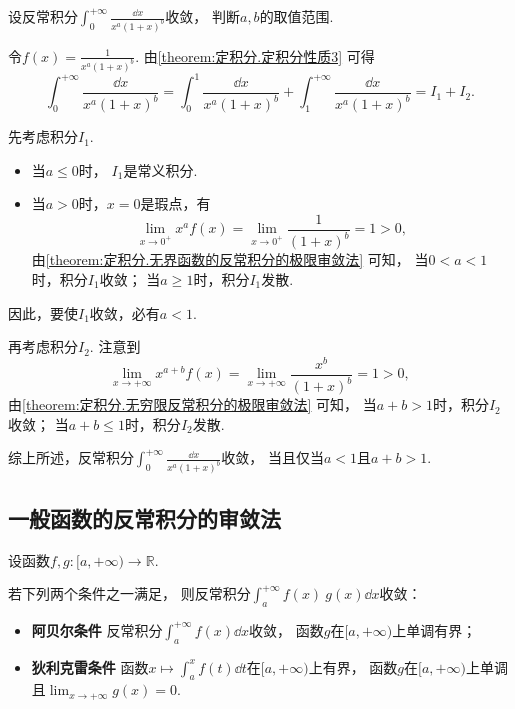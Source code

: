 \begin{example}
设反常积分\(\int_0^{+\infty} \frac{\dd{x}}{x^a (1+x)^b}\)收敛，
判断\(a,b\)的取值范围.
\begin{solution}
令\(f(x) = \frac1{x^a (1+x)^b}\).
由\cref{theorem:定积分.定积分性质3} 可得\begin{equation*}
	\int_0^{+\infty} \frac{\dd{x}}{x^a (1+x)^b}
	= \int_0^1 \frac{\dd{x}}{x^a (1+x)^b}
	+ \int_1^{+\infty} \frac{\dd{x}}{x^a (1+x)^b}
	= I_1 + I_2.
\end{equation*}

先考虑积分\(I_1\).
\begin{itemize}
	\item 当\(a\leq0\)时，
	\(I_1\)是常义积分.
	\item 当\(a>0\)时，\(x=0\)是瑕点，有\begin{equation*}
		\lim_{x\to0^+} x^a f(x)
		= \lim_{x\to0^+} \frac1{(1+x)^b}
		= 1 > 0,
	\end{equation*}
	由\cref{theorem:定积分.无界函数的反常积分的极限审敛法} 可知，
	当\(0<a<1\)时，积分\(I_1\)收敛；
	当\(a\geq1\)时，积分\(I_1\)发散.
\end{itemize}
因此，要使\(I_1\)收敛，必有\(a < 1\).

再考虑积分\(I_2\).
注意到\begin{equation*}
	\lim_{x\to+\infty} x^{a+b} f(x)
	= \lim_{x\to+\infty} \frac{x^b}{(1+x)^b}
	= 1 > 0,
\end{equation*}
由\cref{theorem:定积分.无穷限反常积分的极限审敛法} 可知，
当\(a+b>1\)时，积分\(I_2\)收敛；
当\(a+b\leq1\)时，积分\(I_2\)发散.

综上所述，反常积分\(\int_0^{+\infty} \frac{\dd{x}}{x^a (1+x)^b}\)收敛，
当且仅当\(a<1\)且\(a+b>1\).
\end{solution}
\end{example}

\subsection{一般函数的反常积分的审敛法}
\begin{theorem}\label{theorem:反常积分.无穷限的反常积分的阿贝尔--狄利克雷审敛法}
设函数\(f,g\colon[a,+\infty)\to\mathbb{R}\).

若下列两个条件之一满足，
则反常积分\(\int_a^{+\infty} f(x) ~ g(x) \dd{x}\)收敛：\begin{itemize}
	\item {\rm\bf 阿贝尔条件}
	反常积分\(\int_a^{+\infty} f(x) \dd{x}\)收敛，
	函数\(g\)在\([a,+\infty)\)上单调有界；

	\item {\rm\bf 狄利克雷条件}
	函数\(x \mapsto \int_a^x f(t) \dd{t}\)在\([a,+\infty)\)上有界，
	函数\(g\)在\([a,+\infty)\)上单调且\(\lim_{x\to+\infty} g(x) = 0\).
\end{itemize}
\end{theorem}

